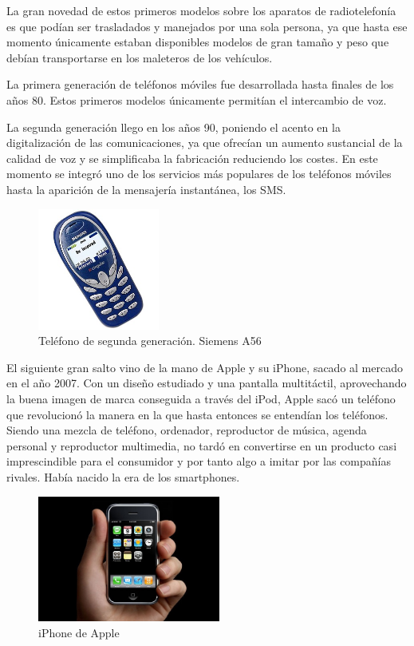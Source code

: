 La gran novedad de estos primeros modelos sobre los aparatos de radiotelefonía es que podían ser trasladados y manejados por una sola persona, ya que hasta ese momento únicamente estaban disponibles modelos de gran tamaño y peso que debían transportarse en los maleteros de los vehículos.

La primera generación de teléfonos móviles fue desarrollada hasta finales de los años 80. Estos primeros modelos únicamente permitían el intercambio de voz.

La segunda generación llego en los años 90, poniendo el acento en la digitalización de las comunicaciones, ya que ofrecían un aumento sustancial de la calidad de voz y se simplificaba la fabricación reduciendo los costes. En este momento se integró uno de los servicios más populares de los teléfonos móviles hasta la aparición de la mensajería instantánea, los \ac{SMS}.

\begin{figure}[h!btp]
\centering
\includegraphics[height=40mm, fbox={\fboxrule} 4mm]{images/03-antecedentes/29-siemens_a56.jpg}
\caption{Teléfono de segunda generación. Siemens A56}
\label{fig:siemens-a56}
\end{figure}

El siguiente gran salto vino de la mano de Apple y su iPhone, sacado al mercado en el año 2007. Con un diseño estudiado y una pantalla multitáctil, aprovechando la buena imagen de marca conseguida a través del iPod, Apple sacó un teléfono que revolucionó la manera en la que hasta entonces se entendían los teléfonos. Siendo una mezcla de teléfono, ordenador, reproductor de música, agenda personal y reproductor multimedia, no tardó en convertirse en un producto casi imprescindible para el consumidor y por tanto algo a imitar por las compañías rivales. Había nacido la era de los smartphones.

\begin{figure}[h!btp]
\centering
\includegraphics[width=60mm, fbox={\fboxrule} 4mm]{images/03-antecedentes/30-iphone.jpg}
\caption{iPhone de Apple}
\label{fig:iphone}
\end{figure}

